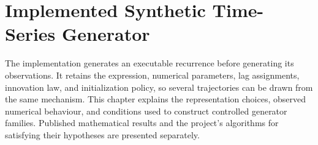 \clearpage
\section{Implemented Synthetic Time-Series Generator}
\label{sec:implemented-generator}

The implementation generates an executable recurrence before generating its
observations. It retains the expression, numerical parameters, lag assignments,
innovation law, and initialization policy, so several trajectories can be drawn
from the same mechanism. This chapter explains the representation choices,
observed numerical behaviour, and conditions used to construct controlled
generator families. Published mathematical results and the project's
algorithms for satisfying their hypotheses are presented separately.






